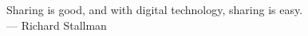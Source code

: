 \thispagestyle{empty}
{}

\vspace*{3cm}

\begin{center}
    Sharing is good, and with digital technology, sharing is easy. \\ \medskip
    --- Richard Stallman
\end{center}

\medskip

